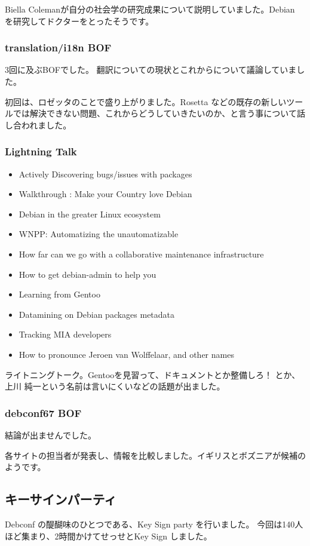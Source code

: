 \documentclass[mingoth,a4paper]{jsarticle}
\begin{document}
Biella Colemanが自分の社会学の研究成果について説明していました。Debian 
を研究してドクターをとったそうです。

\subsubsection{translation/i18n BOF}

3回に及ぶBOFでした。
翻訳についての現状とこれからについて議論していました。

初回は、ロゼッタのことで盛り上がりました。Rosetta などの既存の新しいツー
ルでは解決できない問題、これからどうしていきたいのか、と言う事について話
し合われました。

\subsubsection{Lightning Talk}
\begin{itemize}
	\item Actively Discovering bugs/issues with packages
	\item Walkthrough : Make your Country love Debian
	\item Debian in the greater Linux ecosystem
	\item WNPP: Automatizing the unautomatizable
	\item How far can we go with a collaborative maintenance infrastructure
	\item How to get debian-admin to help you
	\item Learning from Gentoo
	\item Datamining on Debian packages metadata
	\item Tracking MIA developers
	\item How to pronounce Jeroen van Wolffelaar, and other names
\end{itemize}

	ライトニングトーク。Gentooを見習って、ドキュメントとか整備しろ！
	とか、上川 純一という名前は言いにくいなどの話題が出ました。

\subsubsection{debconf67 BOF}

結論が出ませんでした。

各サイトの担当者が発表し、情報を比較しました。イギリスとボズニアが候補の
ようです。

\subsection{キーサインパーティ}
 Debconf の醍醐味のひとつである、Key Sign party を行いました。
今回は140人ほど集まり、2時間かけてせっせとKey Sign しました。
\end{document}
